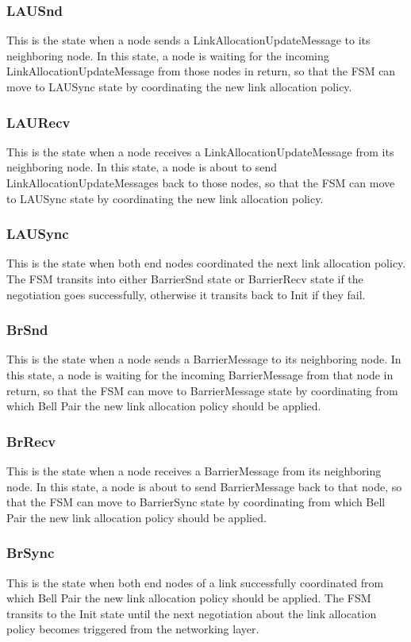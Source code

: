 \subsubsection{LAUSnd}
This is the state when a node sends a LinkAllocationUpdateMessage to its neighboring node. 
In this state, a node is waiting for the incoming LinkAllocationUpdateMessage from those nodes in return, 
so that the FSM can move to LAUSync state by coordinating the new link allocation policy.

\subsubsection{LAURecv}
This is the state when a node receives a LinkAllocationUpdateMessage from its neighboring node. 
In this state, a node is about to send LinkAllocationUpdateMessages back to those nodes, so that the FSM can move to LAUSync state by coordinating the new link allocation policy.

\subsubsection{LAUSync}
This is the state when both end nodes coordinated the next link allocation policy.
The FSM transits into either BarrierSnd state or BarrierRecv state if the negotiation goes successfully, otherwise it transits back to Init if they fail.

\subsubsection{BrSnd}
This is the state when a node sends a BarrierMessage to its neighboring node. 
In this state, a node is waiting for the incoming BarrierMessage from that node in return, 
so that the FSM can move to BarrierMessage state by coordinating from which Bell Pair the new link allocation policy should be applied.

\subsubsection{BrRecv}
This is the state when a node receives a BarrierMessage from its neighboring node. 
In this state, a node is about to send BarrierMessage back to that node, 
so that the FSM can move to BarrierSync state by coordinating from which Bell Pair the new link allocation policy should be applied.

\subsubsection{BrSync}
This is the state when both end nodes of a link successfully coordinated from which Bell Pair the new link allocation policy should be applied.
The FSM transits to the Init state until the next negotiation about the link allocation policy becomes triggered from the networking layer.


